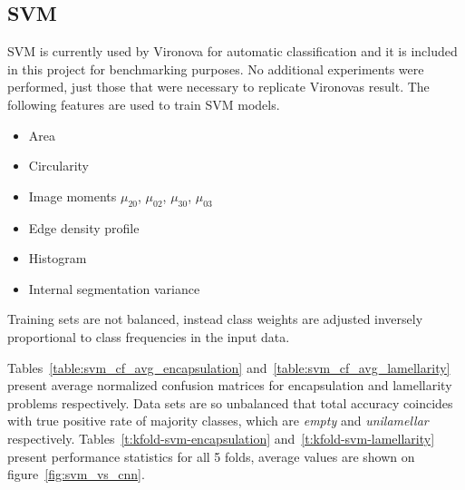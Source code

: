 \documentclass[a4paper, 11pt, table]{article}
\begin{document}
%

\subsection{SVM}
SVM is currently used by Vironova for automatic classification and it is included in this project for benchmarking purposes. No additional experiments were performed, just those that were necessary to replicate Vironovas result. 
The following features are used to train SVM models.
\begin{itemize}
\item Area
\item Circularity
\item Image moments $\mu_{20}$, $\mu_{02}$, $\mu_{30}$, $\mu_{03}$
\item Edge density profile
\item Histogram
\item Internal segmentation variance
\end{itemize}

Training sets are not balanced, instead class weights are adjusted inversely proportional to class frequencies in the input data.

Tables~\ref{table:svm_cf_avg_encapsulation} and~\ref{table:svm_cf_avg_lamellarity} present average normalized confusion matrices for encapsulation and lamellarity problems respectively. Data sets are so unbalanced that total accuracy coincides with true positive rate of majority classes, which are \textit{empty} and \textit{unilamellar} respectively. Tables~\ref{t:kfold-svm-encapsulation} and~\ref{t:kfold-svm-lamellarity} present performance statistics for all 5 folds, average values are shown on figure~\ref{fig:svm_vs_cnn}.
\end{document}
